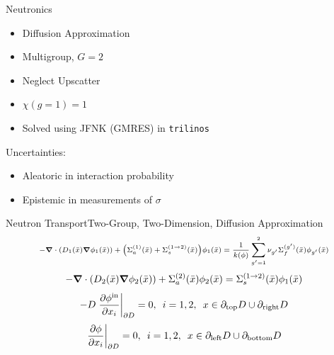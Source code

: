 \documentclass{beamer}
\newcommand{\xs}[2]{\ensuremath{\Sigma_{#1}^{(#2)}}}
\begin{document}
\begin{frame}{Neutronics}
\begin{itemize}\vspace{-20pt}
\item Diffusion Approximation
\item Multigroup, $G=2$
\item Neglect Upscatter
\item $\chi(g=1)=1$
\item Solved using JFNK (GMRES) in \texttt{trilinos}
\end{itemize}\vspace{10pt}
Uncertainties:
\begin{itemize}
\item Aleatoric in interaction probability
\item Epistemic in measurements of $\sigma$
\end{itemize}
\end{frame}

\begin{frame}{Neutron Transport}{Two-Group, Two-Dimension, Diffusion Approximation}
\vspace{-30pt}
\begin{equation} \scriptsize
-\grad\cdot\qty( D_1(\bar x)\grad\phi_1(\bar x))+\qty(\xs{a}{1}(\bar x)+\xs{s}{1\to2}(\bar x))\phi_1(\bar x) = \frac{1}{k(\phi)}\sum_{g'=1}^2\nu_{g'}\xs{f}{g'}(\bar x)\phi_{g'}(\bar x) \nonumber
\end{equation}
\begin{equation}
-\grad \cdot\qty(D_2(\bar x)\grad \phi_2(\bar x))+\xs{a}{2}(\bar x)\phi_2(\bar x) = \xs{s}{1\to 2}(\bar x)\phi_1(\bar x)\nonumber
\end{equation}
\vspace{20pt}
\begin{equation}
-D\eval{\pdv{\phi^{\text{in}}}{x_i}}_{\partial D}=0,\hspace{5pt}i=1,2,\hspace{5pt}
    x\in\partial_\text{top}D\cup\partial_\text{right}D\nonumber
\end{equation}
\begin{equation}
\eval{\pdv{\phi}{x_i}}_{\partial D}=0,\hspace{5pt}i=1,2,\hspace{5pt}
    x\in\partial_\text{left}D\cup\partial_\text{bottom}D\nonumber
\end{equation}
\end{frame}

\end{document}
